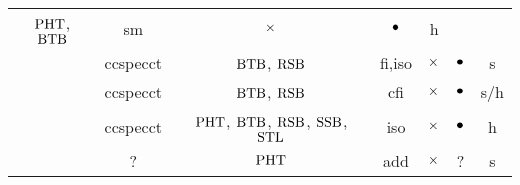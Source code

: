 \documentclass[12pt]{article}
\newcommand{\fullsec}{\ensuremath\bullet}
\newcommand{\informal}{\ensuremath\times}
\newcommand{\specpht}{\ensuremath\text{PHT}}
\newcommand{\specssb}{\ensuremath\text{SSB}} %
\newcommand{\specrsb}{\ensuremath\text{RSB}}
\newcommand{\specbtb}{\ensuremath\text{BTB}}
\newcommand{\specstl}{\ensuremath\text{STL}}
\begin{document}
\begin{center}
\begin{tabular}{|c|c|c|c|c|c|c|}
    $\specpht$, $\specbtb$ &
    \acrshort{sm} &
    $\informal$ &
    $\fullsec$ &
    \acrshort{h}
    \\
    \cite{shen2019venkman} &
    \acrshort{ccspecct} &
    $\specbtb$, $\specrsb$ &
    \acrshort{fi},\acrshort{iso} &
    $\informal$ &
    $\fullsec$ &
    \acrshort{s}
    \\
    \cite{koruyeh2019speccfi} &
    \acrshort{ccspecct} &
    $\specbtb$, $\specrsb$ &
    \acrshort{cfi} &
    $\informal$ &
    $\fullsec$ &
    \acrshort{s}/\acrshort{h}
    \\
    \cite{yan2018invisispec} &
    \acrshort{ccspecct} &
    $\specpht$, $\specbtb$, $\specrsb$, $\specssb$, $\specstl$  &
    \acrshort{iso} &
    $\informal$ &
    $\fullsec$ &
    \acrshort{h}
    \\
    \cite{eleksenko2018bypass} &
    ? &
    $\specpht$ &
    \acrshort{add} &
    $\informal$ &
    ? &
    \acrshort{s}
    \\
    \hline
  \end{tabular}
\end{center}


\printglossary

\clearpage


\end{document}
